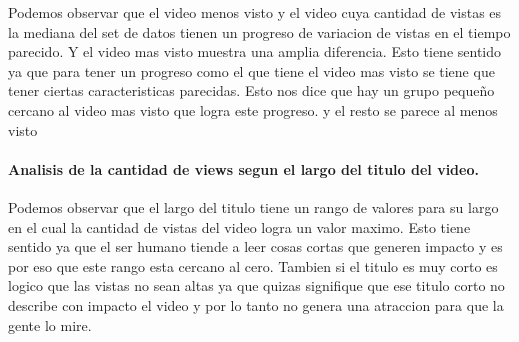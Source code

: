             \begin{figure}[ht]
            \end{figure}
        \FloatBarrier
        Podemos observar que el video menos visto y el video cuya cantidad de
        vistas es la mediana del set de datos tienen un progreso de variacion de
        vistas en el tiempo parecido. Y el video mas visto muestra una amplia
        diferencia. Esto tiene sentido ya que para tener un progreso como el que
        tiene el video mas visto se tiene que tener ciertas caracteristicas
        parecidas. Esto nos dice que hay un grupo pequeño cercano al video mas
        visto que logra este progreso. y el resto se parece al menos visto
        \newpage

        \paragraph{Analisis de la cantidad de views segun el largo del titulo del video.}

            \begin{figure}[ht]
            \end{figure}
        \FloatBarrier
        Podemos observar que el largo del titulo tiene un rango de valores para
        su largo en el cual la cantidad de vistas del video logra un valor maximo.
        Esto tiene sentido ya que el ser humano tiende a leer cosas cortas que
        generen impacto y es por eso que este rango esta cercano al cero. Tambien
        si el titulo es muy corto es logico que las vistas no sean altas ya que quizas
        signifique que ese titulo corto no describe con impacto el video y por lo tanto
        no genera una atraccion para que la gente lo mire.
        \newpage

